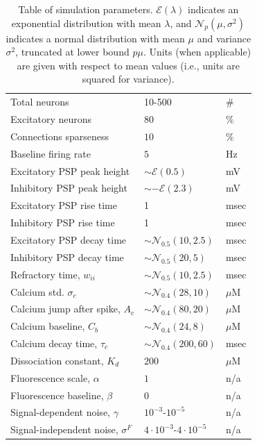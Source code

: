 \documentclass[aoas,preprint]{imsart}
\begin{document}
\begin{table}[h!b!p!]
\caption{Table of simulation parameters. $\mathcal{E}(\lambda)$
indicates an exponential distribution with mean $\lambda$, and
$\mathcal{N}_p(\mu,\sigma^2)$ indicates a normal distribution with
mean $\mu$ and variance $\sigma^2$, truncated at lower bound $p\mu$.
Units (when applicable) are given with respect to mean values (i.e.,
units are squared for variance).}\label{table:caparm}

\begin{tabular}{lll}
\hline
Total neurons & 10-500 & \# \\
Excitatory neurons & $80$ & $\%$ \\
Connections sparseness & $10$   & $\%$ \\
Baseline firing rate & $5$ & Hz\\
\hline
Excitatory PSP peak height 	& $\sim \mathcal{E}(0.5)$ & mV \\
Inhibitory PSP peak height 	& $\sim -\mathcal{E}(2.3)$ & mV \\
Excitatory PSP rise time 		& 1 & msec \\
Inhibitory PSP rise time 		& 1 & msec \\
Excitatory PSP decay time 	& $\sim \mathcal{N}_{0.5}(10,2.5)$ & msec \\
Inhibitory PSP decay time 	& $\sim \mathcal{N}_{0.5}(20,5)$ & msec\\
Refractory time, $w_{ii}$ 	& $\sim \mathcal{N}_{0.5}(10,2.5)$ & msec \\
\hline
Calcium std. $\sigma_c$ & $\sim \mathcal{N}_{0.4}(28,10)$ & $\mu$M\\
Calcium jump after spike, $A_c$ &  $\sim \mathcal{N}_{0.4}(80,20)$ & $\mu$M\\
Calcium baseline, $C_b$ & $\sim \mathcal{N}_{0.4}(24,8)$ & $\mu$M\\
Calcium decay time, $\tau_c$ & $\sim \mathcal{N}_{0.4}(200,60)$ & msec\\
Dissociation constant, $K_d$ & $200$ & $\mu$M \\
\hline
Fluorescence scale, $\alpha$ & $1$ & n/a\\
Fluorescence baseline, $\beta$ & $0$ &  n/a\\
Signal-dependent noise, $\gamma$ & $10^{-3}$-$10^{-5}$ & n/a\\
Signal-independent noise, $\sigma^F$ & $4\cdot 10^{-3}$-$4\cdot 10^{-5}$ & n/a\\
\end{tabular}
\end{table}
\end{document}
